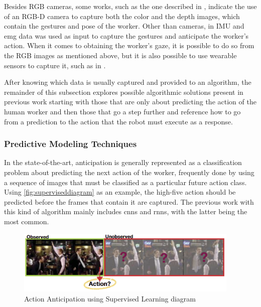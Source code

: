 Besides RGB cameras, some works, such as the one described in \textcite{Moutinho2023}, indicate the use of an RGB-D camera to capture both the color and the depth images, which contain the gestures and pose of the worker. Other than cameras, in \textcite{Tortora2019} IMU and \acs{emg} data was used as input to capture the gestures and anticipate the worker's action. When it comes to obtaining the worker's gaze, it is possible to do so from the RGB images as mentioned above, but it is also possible to use wearable sensors to capture it, such as in \textcite{Schydlo2018}.


After knowing which data is usually captured and provided to an algorithm, the remainder of this subsection explores possible algorithmic solutions present in previous work starting with those that are only about predicting the action of the human worker and then those that go a step further and reference how to go from a prediction to the action that the robot must execute as a response.

\subsubsection{Predictive Modeling Techniques}

In the state-of-the-art, anticipation is generally represented as a classification problem about predicting the next action of the worker, frequently done by using a sequence of images that must be classified as a particular future action class. Using \autoref{fig:superviseddiagram} as an example, the high-five action should be predicted before the frames that contain it are captured. The previous work with this kind of algorithm mainly includes \acfp{cnn} and \acfp{rnn}, with the latter being the most common.

\begin{figure}[ht]
    \centering
    \includegraphics[width=0.95\textwidth]{figs/superviseddiagram.PNG}
    \caption[Action Anticipation using Supervised Learning diagram]{Action Anticipation using Supervised Learning diagram \cite{Gammulle2019}}
    \label{fig:superviseddiagram}
\end{figure}

